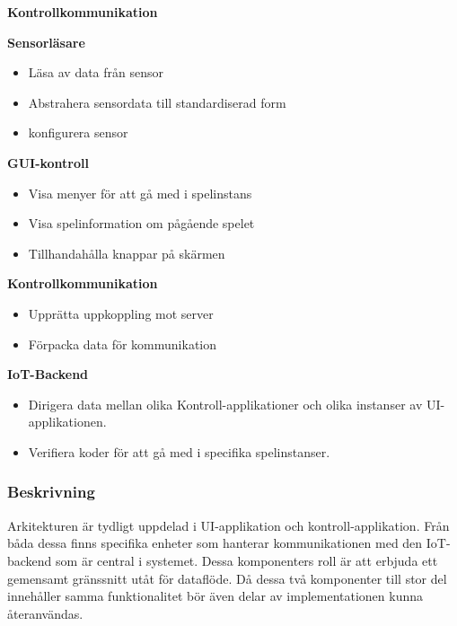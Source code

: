 \begin{labeling}{\small{\textbf{Kontrollkommunikation}}}
    \item [\small{\textbf{Sensorläsare}}]
        \begin{itemize}
            \item Läsa av data från sensor
            \item Abstrahera sensordata till standardiserad form
            \item konfigurera sensor
            \newline
        \end{itemize}

    \item [\small{\textbf{GUI-kontroll}}]
        \begin{itemize}
            \item Visa menyer för att gå med i spelinstans
            \item Visa spelinformation om pågående spelet
            \item Tillhandahålla knappar på skärmen
            \newline
        \end{itemize}

    \item [\small{\textbf{Kontrollkommunikation}}]
        \begin{itemize}
            \item Upprätta uppkoppling mot server
            \item Förpacka data för kommunikation
            \newline
        \end{itemize}

    \item [\small{\textbf{IoT-Backend}}]
        \begin{itemize}
            \item Dirigera data mellan olika Kontroll-applikationer och olika instanser av UI-applikationen.
            \item Verifiera koder för att gå med i specifika spelinstanser.
            \newline
        \end{itemize}
\end{labeling}

\subsubsection{Beskrivning}
Arkitekturen är tydligt uppdelad i UI-applikation och kontroll-applikation. Från båda dessa finns specifika enheter som hanterar kommunikationen med den IoT-backend som är central i systemet. Dessa komponenters roll är att erbjuda ett gemensamt gränssnitt utåt för dataflöde. Då dessa två komponenter till stor del innehåller samma funktionalitet bör även delar av implementationen kunna återanvändas.\\

